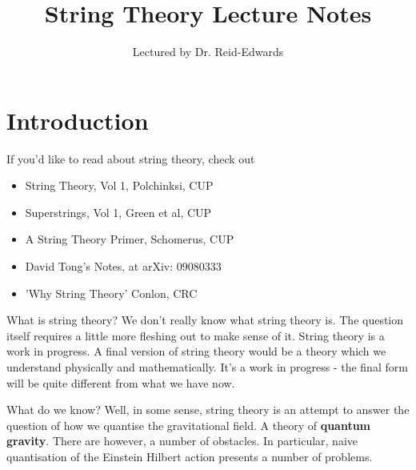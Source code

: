 \documentclass[11pt, oneside]{article}   	%
\title{String Theory Lecture Notes}
\author{Lectured by Dr. Reid-Edwards}
\theoremstyle{slanted}
\begin{document}
 
\maketitle
\tableofcontents

\pagebreak 

\section{Introduction}%
\label{sec:introduction}

If you'd like to read about string theory, 
check out 
\begin{itemize}
\item String Theory, Vol 1, Polchinksi, CUP 
\item Superstrings, Vol 1, Green et al, CUP
\item A String Theory Primer, Schomerus, CUP
\item David Tong's Notes, at arXiv: 09080333
\item 'Why String Theory' Conlon, CRC  
\end{itemize}

What is string theory? 
We don't really know what string theory is. 
The question itself requires a little more 
fleshing out to make sense of it. String theory 
is a work in progress. A final version of string 
theory would be a theory which we understand physically 
and mathematically. 
It's a work in progress - the final form will 
be quite different from what we have now. 

What do we know? 
Well, in some sense, string theory 
is an attempt to answer the question of how we quantise the 
gravitational field. A theory of \textbf{quantum gravity}. 
There are however, a number of obstacles.
In particular, naive quantisation of the 
Einstein Hilbert action presents a number of problems. 
\end{document}

